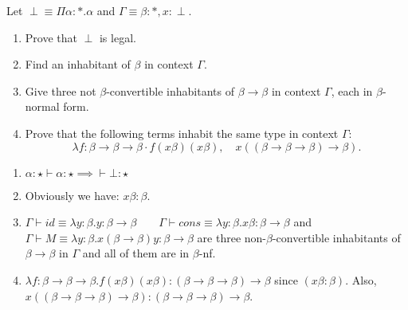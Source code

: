 \begin{problem}{3.5}
    Let $\perp \equiv \Pi\alpha : * . \alpha$ and $\Gamma \equiv \beta : * , x : \perp$.
    \begin{enumerate}[label=$(\alph*)$]
    \item Prove that $\perp$ is legal.
    \item Find an inhabitant of $\beta$ in context $\Gamma$.
    \item Give three not $\beta$-convertible inhabitants of $\beta \rightarrow \beta$ in context $\Gamma$, each in $\beta$-normal form.
    \item Prove that the following terms inhabit the same type in context $\Gamma$:
        $$\lambda f : \beta \rightarrow \beta \rightarrow \beta \cdot f(x \beta)(x \beta), \quad x((\beta \rightarrow \beta \rightarrow \beta) \rightarrow \beta).$$
    \end{enumerate}
\end{problem}

\begin{solution}
    \begin{enumerate}[label=$(\alph*)$]
        \item $\alpha:\star \vdash \alpha:\star \implies \vdash \bot : \star$
        \item Obviously we have: $x\beta:\beta$.
        \item $ \Gamma \vdash id \equiv \lambda y:\beta . y : \beta \to \beta \qquad \Gamma \vdash cons \equiv \lambda y:\beta .x\beta : \beta \to \beta $ and \\
                $ \Gamma \vdash M \equiv \lambda y:\beta.x(\beta \to \beta)y : \beta \to \beta $ are three non-$\beta$-convertible inhabitants of $\beta\to\beta$ in $\Gamma$ and all of them are in $\beta$-nf.
        \item $\lambda f:\beta\to\beta\to\beta.f(x\beta)(x\beta) : (\beta\to\beta\to\beta)\to\beta $ since $(x\beta:\beta)$. Also, \\ $x((\beta\to\beta\to\beta)\to\beta) : (\beta\to\beta\to\beta)\to\beta$.
    \end{enumerate}
\end{solution}